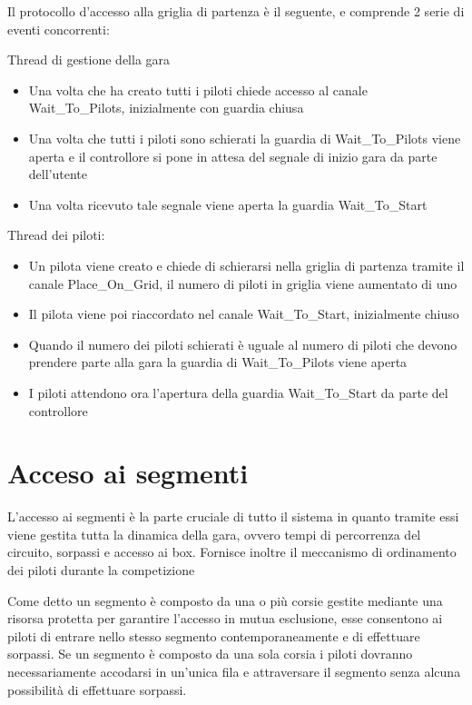 \documentclass[a4paper,11pt, twoside]{book}
\begin{document}
      Il protocollo d'accesso alla griglia di partenza è il seguente, e comprende 2 serie di eventi
      concorrenti:
      
      Thread di gestione della gara
      \begin{itemize}
	\item Una volta che ha creato tutti i piloti chiede accesso al canale Wait\_To\_Pilots,
	      inizialmente con guardia chiusa
	\item Una volta che tutti i piloti sono schierati la guardia di Wait\_To\_Pilots viene aperta e il controllore
	      si pone in attesa del segnale di inizio gara da parte dell'utente
	\item Una volta ricevuto tale segnale viene aperta la guardia Wait\_To\_Start
      \end{itemize}
      
      Thread dei piloti:
      \begin{itemize}
	\item Un pilota viene creato e chiede di schierarsi nella griglia di partenza tramite il canale Place\_On\_Grid,
              il numero di piloti in griglia viene aumentato di uno
	\item Il pilota viene poi riaccordato nel canale Wait\_To\_Start, inizialmente chiuso
	\item Quando il numero dei piloti schierati è uguale al numero di piloti che devono prendere parte alla gara
	      la guardia di Wait\_To\_Pilots viene aperta
	\item I piloti attendono ora l'apertura della guardia Wait\_To\_Start da parte del controllore
      \end{itemize}

	    
    \section{Acceso ai segmenti}
    \label{Accesso ai segmenti}
      L'accesso ai segmenti è la parte cruciale di tutto il sistema in quanto tramite essi viene gestita
      tutta la dinamica della gara, ovvero tempi di percorrenza del circuito, sorpassi e accesso ai box.
      Fornisce inoltre il meccanismo di ordinamento dei piloti durante la competizione
      
      Come detto un segmento è composto da una o più corsie gestite mediante una risorsa protetta per garantire
      l'accesso in mutua esclusione, esse consentono ai piloti di entrare nello stesso segmento 
      contemporaneamente e di effettuare sorpassi.
      Se un segmento è composto da una sola corsia i piloti dovranno necessariamente accodarsi in un'unica fila e attraversare
      il segmento senza alcuna possibilità di effettuare sorpassi.
      
\end{document}
